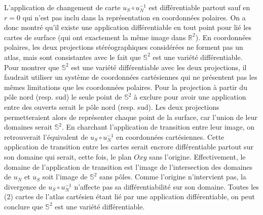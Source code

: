 L'application de changement de carte $u_S \circ u_N^{-1}$ est différentiable partout sauf en $r = 0$ qui n'est pas inclu dans la représentation en coordonnées polaires. On a donc montré qu'il existe une application différentiable en tout point pour lié les cartes de surface (qui ont exactement la même image dans $\mathbb{R}^2$). En coordonnées polaires, les deux projections stéréographiques considérées ne forment pas un atlas, mais sont consistantes avec le fait que $\mathbb{S}^2$ est une variété différentiable. Pour montrer que $\mathbb{S}^2$ est une variété différentiable avec les deux projections, il faudrait utiliser un système de coordonnées cartésiennes qui ne présentent pas les mêmes limitations que les coordonnées polaires. Pour la projection à partir du pôle nord (resp. sud) le seule point de $\mathbb{S}^2$ à exclure pour avoir une application entre des ouverts serait le pôle nord (resp. sud). Les deux projections permetteraient alors de représenter chaque point de la surface, car l'union de leur domaines serait $\mathbb{S}^2$. En charchant l'application de transition entre leur image, on retrouverait l'équivalent de $u_S \circ u_N^{-1}$ en coordonnées cartésiennes. Cette application de transition entre les cartes serait encrore différentiable partout sur son domaine qui serait, cette fois, le plan $Oxy$ sans l'origine. Effectivement, le domaine de l'application de transition est l'image de l'intersection des domaines de $u_N$ et $u_S$ soit l'image de $\mathbb{S}^2$ sans pôles. Comme l'origine n'intervient pas, la divergence de $u_S \circ u_N^{-1}$ n'affecte pas sa différentiabilité sur son domaine. Toutes les (2) cartes de l'atlas cartésien étant lié par une application différentiable, on peut conclure que $\mathbb{S}^2$ est une variété différentiable.







